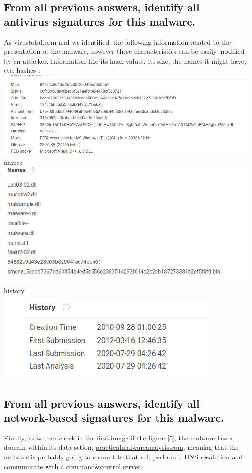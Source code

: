 \documentclass[12pt,letter]{article} %
\begin{document}
        \subsection{From all previous answers, identify all antivirus signatures for this malware.}
        	As virustotal.com and we identified, the following information related to the presentation of the malware, however these characteristics can be easily modified by an attacker. Information like its hash values, its size, the names it might have, etc.
            hashes :\\
            \includegraphics[width=0.8\linewidth]{hashes.png}
            \\ names
            \\ \includegraphics[width=0.8\linewidth]{names.png}
            \\ history
            \\ \includegraphics[width=0.8\linewidth]{hist.png}

        \subsection{From all previous answers, identify all network-based signatures for this malware.}
        Finally, as we can check in the first image if the figure \ref{5}, the malware has a domain within its data setion, \url{practicalmalwareanalysis.com}, meaning that the malware is probably going to connect to that url, perform a DNS resolution and communicate with a command\&control server.
\end{document}
